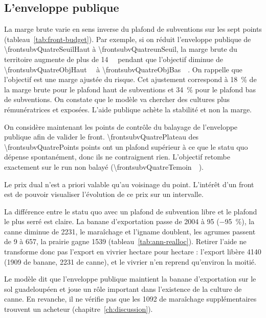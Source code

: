 \subsection*{L'enveloppe publique}

La marge brute varie en sens inverse du plafond de subventions sur les sept points
(tableau~\ref{tab:front-budget}). Par exemple, si on réduit l'enveloppe publique de
\SI{\frontsubvQuatreSeuilHaut}{\euros} à \SI{\frontsubvQuatreunSeuil}{\euros}, la marge brute du
territoire augmente de plus de \SI{14}{\mega\euros} pendant que l'objectif diminue de
\SI{\frontsubvQuatreObjHaut}{\mega\euros} à \SI{\frontsubvQuatreObjBas}{\mega\euros}. On rappelle
que l'objectif est une marge ajustée du risque. Cet ajustement correspond à \SI{18}{\percent} de
la marge brute pour le plafond haut de subventions et \SI{34}{\percent} pour le plafond bas de
subventions. On constate que le modèle va chercher des cultures plus rémunératrices et exposées.
L'aide publique achète la stabilité et non la marge.

On considère maintenant les points de contrôle du balayage de l'enveloppe publique afin de
valider le front. \num{\frontsubvQuatrePlateau} des \num{\frontsubvQuatrePoints} points ont un
plafond supérieur à ce que le statu quo dépense spontanément, donc ils ne contraignent rien.
L'objectif retombe exactement sur le run non balayé (\SI{\frontsubvQuatreTemoin}{\mega\euros}).

Le prix dual n'est a priori valable qu'au voisinage du point. L'intérêt d'un front est de
pouvoir visualiser l'évolution de ce prix sur un intervalle.

La différence entre le statu quo avec un plafond de subvention libre et le plafond le plus serré
est claire. La banane d'exportation passe de \SI{2004}{\ha} à \SI{95}{\ha}
(\SI{-95}{\percent}), la canne diminue de \SI{2231}{\ha}, le maraîchage et l'igname doublent, les
agrumes passent de \SI{9}{\ha} à \SI{657}{\ha}, la prairie gagne \SI{1539}{\ha}
(tableau~\ref{tab:ann-realloc}). Retirer l'aide ne transforme donc pas l'export en vivrier
hectare pour hectare : l'export libère \SI{4140}{\ha} (\SI{1909}{\ha} de banane, \SI{2231}{\ha}
de canne), et le vivrier n'en reprend qu'environ la moitié.

Le modèle dit que l'enveloppe publique maintient la banane d'exportation sur le sol
guadeloupéen et joue un rôle important dans l'existence de la culture de canne. En revanche, il
ne vérifie pas que les \SI{1092}{\ha} de maraîchage supplémentaires trouvent un acheteur
(chapitre~\ref{ch:discussion}).


